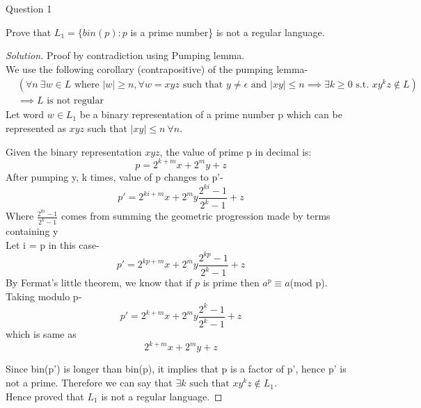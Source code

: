 \begin{solution}{Question 1}\label{ques:1}
    \begin{question}
    Prove that $L_1 = \{bin(p) : p$ is a prime number\} is not a regular language.
    \end{question}
    \tcblower{}
    \begin{proof}[Solution]
    Proof by contradiction using Pumping lemma.\\
    We use the following corollary (contrapositive) of the pumping lemma-
    \begin{equation}
      \begin{split}
        &(\forall n \ \exists w \in L \text{ where }|w| \geq n, \forall w = xyz \text{ such that } y\neq \epsilon \text{ and }|xy| \leq n \implies \exists k \geq 0 \text{ s.t. }xy^kz \not\in L)\\
        &\implies L\text{ is not regular}
      \end{split}
    \end{equation}
    Let word $w\in L_1$ be a binary representation of a prime number p which can be represented as $xyz$ such that $|xy|\leq n\  \forall n$.
    
    Given the binary representation $xyz$, the value of prime p in decimal is:
    $$p=2^{k+m}x + 2^my + z$$
    After pumping y, k times, value of p changes to p'-
    $$p' = 2^{ki+m}x + 2^my\frac{2^{ki}-1}{2^k-1} + z$$ %
    Where $\frac{2^{ki}-1}{2^k-1}$ comes from summing the geometric progression made by terms containing y\\
    Let i = p in this case-
    $$p' = 2^{kp+m}x + 2^my\frac{2^{kp}-1}{2^k-1} + z$$ %
    By Fermat's little theorem, we know that if $p$ is prime then $a^p \equiv a$(mod p).\\
    Taking modulo p-
    $$p' = 2^{k+m}x + 2^my\frac{2^k-1}{2^k-1} + z$$ %
    which is same as
    $$2^{k+m}x + 2^my + z$$
    
    Since bin(p') is longer than bin(p), it implies that p is a factor of p', hence p' is not a prime.
    Therefore we can say that $\exists k \text{ such that } xy^kz \not\in L_1$.\\
    Hence proved that $L_1$ is not a regular language.
    \end{proof}
\end{solution}
